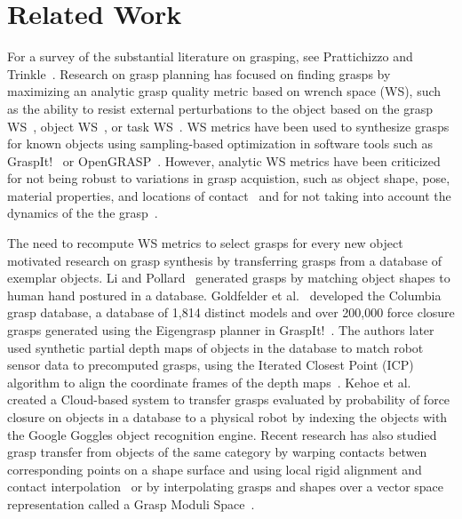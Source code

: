 \section{Related Work}

For a survey of the substantial literature on grasping, see Prattichizzo and Trinkle~\cite{prattichizzo2008grasping}.
Research on grasp planning has focused on finding grasps by maximizing an analytic grasp quality metric based on wrench space (WS), such as the ability to resist external perturbations to the object based on the grasp WS~\cite{ferrari1992, miller2004graspit}, object WS~\cite{liu2015fast, pollard1994parallel}, or task WS~\cite{kruger2011partial, li1988task}.
WS metrics have been used to synthesize grasps for known objects using sampling-based optimization in software tools such as GraspIt!~\cite{miller2004graspit} or OpenGRASP~\cite{leon2010opengrasp}.
However, analytic WS metrics have been criticized~\cite{balasubramanian2012physical, weisz2012pose} for not being robust to variations in grasp acquistion, such as object shape, pose, material properties, and locations of contact~\cite{cheong2011output, diankov2010automated, weisz2012pose, zheng2005} and for not taking into account the dynamics of the the grasp~\cite{prattichizzo2008grasping}.

The need to recompute WS metrics to select grasps for every new object motivated research on grasp synthesis by transferring grasps from a database of exemplar objects.
Li and Pollard~\cite{li2005shape} generated grasps by matching object shapes to human hand postured in a database.
Goldfelder et al.~\cite{goldfeder2009columbia} developed the Columbia grasp database, a database of 1,814 distinct models and over 200,000 force closure grasps generated using the Eigengrasp planner in GraspIt!~\cite{ciocarlie2009}.
The authors later used synthetic partial depth maps of objects in the database to match robot sensor data to precomputed grasps, using the Iterated Closest Point (ICP) algorithm to align the coordinate frames of the depth maps~\cite{goldfeder2009data, goldfeder2011data}.
Kehoe et al.~\cite{kehoe2013cloud} created a Cloud-based system to transfer grasps evaluated by probability of force closure on objects in a database to a physical robot by indexing the objects with the Google Goggles object recognition engine.
Recent research has also studied grasp transfer from objects of the same category by warping contacts betwen corresponding points on a shape surface and using local rigid alignment and contact interpolation~\cite{hillenbrand2012transferring, stouraitis2015functional} or by interpolating grasps and shapes over a vector space representation called a Grasp Moduli Space~\cite{pokorny2014grasp, pokorny2013grasp}.

